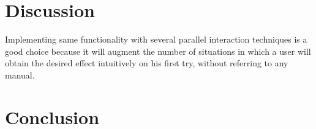\chapter{Discussion}
\label{discussion}

Implementing same functionality with several parallel interaction techniques is a good choice because it will augment the number of situations in which a user will obtain the desired effect intuitively on his first try, without referring to any manual.

\chapter{Conclusion}
\label{conclusion}